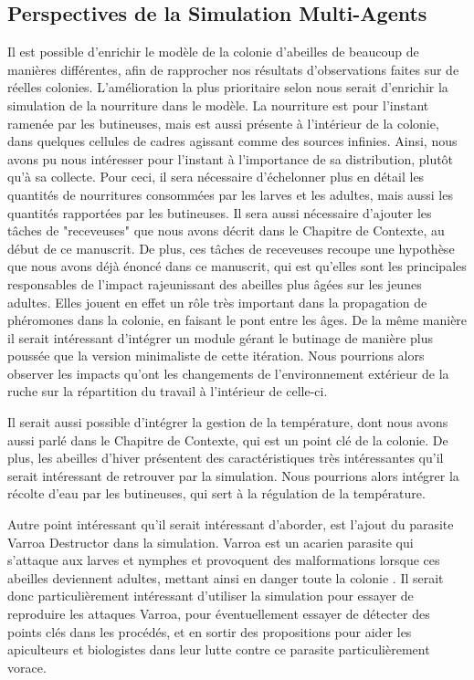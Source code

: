	\subsection{Perspectives de la Simulation Multi-Agents}
	Il est possible d'enrichir le modèle de la colonie d'abeilles de beaucoup de manières différentes, afin de rapprocher nos résultats d'observations faites sur de réelles colonies. L'amélioration la plus prioritaire selon nous serait d'enrichir la simulation de la nourriture dans le modèle. La nourriture est pour l'instant ramenée par les butineuses, mais est aussi présente à l'intérieur de la colonie, dans quelques cellules de cadres agissant comme des sources infinies. Ainsi, nous avons pu nous intéresser pour l'instant à l'importance de sa distribution, plutôt qu'à sa collecte. Pour ceci, il sera nécessaire d'échelonner plus en détail les quantités de nourritures consommées par les larves et les adultes, mais aussi les quantités rapportées par les butineuses. Il sera aussi nécessaire d'ajouter les tâches de "receveuses" que nous avons décrit dans le Chapitre de Contexte, au début de ce manuscrit. De plus, ces tâches de receveuses recoupe une hypothèse que nous avons déjà énoncé dans ce manuscrit, qui est qu'elles sont les principales responsables de l'impact rajeunissant des abeilles plus âgées sur les jeunes adultes. Elles jouent en effet un rôle très important dans la propagation de phéromones dans la colonie, en faisant le pont entre les âges. De la même manière il serait intéressant d'intégrer un module gérant le butinage de manière plus poussée que la version minimaliste de cette itération. Nous pourrions alors observer les impacts qu'ont les changements de l'environnement extérieur de la ruche sur la répartition du travail à l'intérieur de celle-ci.
	
	Il serait aussi possible d'intégrer la gestion de la température, dont nous avons aussi parlé dans le Chapitre de Contexte, qui est un point clé de la colonie. De plus, les abeilles d'hiver présentent des caractéristiques très intéressantes qu'il serait intéressant de retrouver par la simulation. Nous pourrions alors intégrer la récolte d'eau par les butineuses, qui sert à la régulation de la température.
	
	Autre point intéressant qu'il serait intéressant d'aborder, est l'ajout du parasite Varroa Destructor dans la simulation. Varroa est un acarien parasite qui s'attaque aux larves et nymphes et provoquent des malformations lorsque ces abeilles deviennent adultes, mettant ainsi en danger toute la colonie \cite{le_conte_varroa_2010}. Il serait donc particulièrement intéressant d'utiliser la simulation pour essayer de reproduire les attaques Varroa, pour éventuellement essayer de détecter des points clés dans les procédés, et en sortir des propositions pour aider les apiculteurs et biologistes dans leur lutte contre ce parasite particulièrement vorace.
	
